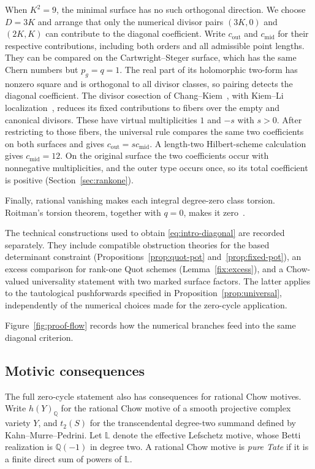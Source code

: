 When $K^2=9$, the minimal surface has no such orthogonal direction.
We choose $D=3K$ and arrange that only the numerical divisor pairs
$(3K,0)$ and $(2K,K)$ can contribute to the diagonal coefficient.
Write $c_{\mathrm{out}}$ and $c_{\mathrm{mid}}$ for their respective
contributions, including both orders and all admissible point lengths.
They can be compared on the Cartwright--Steger surface, which has the same
Chern numbers but $p_g=q=1$. The real part of its holomorphic two-form
has nonzero square and is orthogonal to all divisor classes, so pairing
detects the diagonal coefficient. The divisor cosection of
Chang--Kiem~\cite{ChangKiem}, with Kiem--Li
localization~\cite{KiemLi}, reduces its fixed contributions to fibers
over the empty and canonical divisors. These have virtual
multiplicities $1$ and $-s$ with $s>0$. After restricting to those
fibers, the universal rule compares the same two coefficients on both
surfaces and gives $c_{\mathrm{out}}=s c_{\mathrm{mid}}$.
A length-two Hilbert-scheme calculation gives
$c_{\mathrm{mid}}=12$. On the original surface the two coefficients
occur with nonnegative multiplicities, and the outer type occurs once,
so its total coefficient is positive (Section~\ref{sec:rankone}).

Finally, rational vanishing makes each integral degree-zero class
torsion. Roitman's torsion theorem, together with $q=0$, makes it
zero~\cite{BlochRoitman,Roitman}.

The technical constructions used to obtain
\eqref{eq:intro-diagonal} are recorded separately. They include
compatible obstruction theories for the based determinant constraint
(Propositions~\ref{prop:quot-pot} and~\ref{prop:fixed-pot}),
an excess comparison for rank-one Quot schemes
(Lemma~\ref{fix:excess}), and a Chow-valued
universality statement with two marked surface factors. The latter
applies to the tautological pushforwards specified in
Proposition~\ref{prop:universal}, independently of the numerical choices
made for the zero-cycle application.

Figure~\ref{fig:proof-flow} records how the numerical branches feed
into the same diagonal criterion.



\subsection*{Motivic consequences}

The full zero-cycle statement also has consequences for rational Chow
motives. Write \(h(Y)_{\mathbb Q}\) for the rational Chow motive of a
smooth projective complex variety \(Y\), and \(t_2(S)\) for the
transcendental degree-two summand defined by Kahn--Murre--Pedrini.
Let \(\mathbb L\) denote the effective Lefschetz motive, whose Betti
realization is \(\mathbb Q(-1)\) in degree two. A rational Chow motive
is \emph{pure Tate} if it is a finite direct sum of powers of
\(\mathbb L\).

